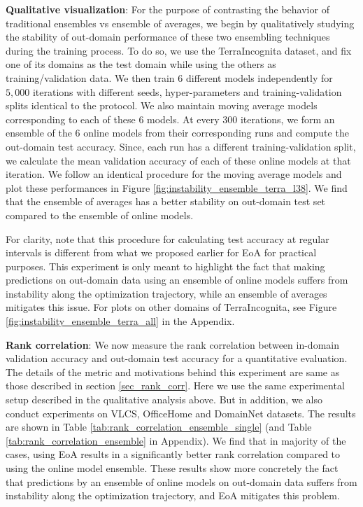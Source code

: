 \documentclass{article}
\begin{document}
\textbf{Qualitative visualization}: For the purpose of contrasting the behavior of traditional ensembles vs ensemble of averages, we begin by qualitatively studying the stability of out-domain performance of these two ensembling techniques during the training process. To do so, we use the TerraIncognita dataset, and fix one of its domains as the test domain while using the others as training/validation data. We then train 6 different models independently for $5,000$ iterations with different seeds, hyper-parameters and training-validation splits identical to the \cite{gulrajani2020search} protocol. We also maintain moving average models corresponding to each of these 6 models. At every $300$ iterations, we form an ensemble of the 6 online models from their corresponding runs and compute the out-domain test accuracy. Since, each run has a different training-validation split, we calculate the mean validation accuracy of each of these online models at that iteration. We follow an identical procedure for the moving average models and plot these performances in Figure \ref{fig:instability_ensemble_terra_l38}. We find that the ensemble of averages has a better stability on out-domain test set compared to the ensemble of online models. 

For clarity, note that this procedure for calculating test accuracy at regular intervals is different from what we proposed earlier for EoA for practical purposes. This experiment is only meant to highlight the fact that making predictions on out-domain data using an ensemble of online models suffers from instability along the optimization trajectory, while an ensemble of averages mitigates this issue. For plots on other domains of TerraIncognita, see Figure \ref{fig:instability_ensemble_terra_all} in the Appendix.





\textbf{Rank correlation}: We now measure the rank correlation between in-domain validation accuracy and out-domain test accuracy for a quantitative evaluation. The details of the metric and motivations behind this experiment are same as those described in section \ref{sec_rank_corr}. Here we use the same experimental setup described in the qualitative analysis above. But in addition, we also conduct experiments on VLCS, OfficeHome and DomainNet datasets. The results are shown in Table \ref{tab:rank_correlation_ensemble_single} (and Table \ref{tab:rank_correlation_ensemble} in Appendix).  We find that in majority of the cases, using EoA results in a significantly better rank correlation compared to using the online model ensemble. These results show more concretely the fact that predictions by an ensemble of online models on out-domain data suffers from instability along the optimization trajectory, and EoA mitigates this problem.
\end{document}
